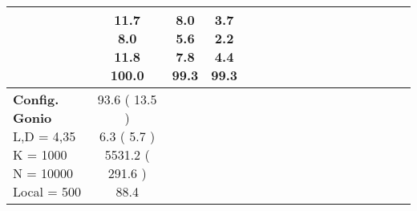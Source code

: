 \documentclass[9pt]{article}
\begin{document}
\begin{landscape}
\begin{longtable}{ l | c c c c | c c c c | c c c c | c c c c |}
             &
                            \makecell{              11.7
     \\
            {\footnotesize             8.0
    } \\  {\footnotesize             11.8
     } \\
            {\small \textcolor[rgb]{ 0.2 , 0.7 , 0.1} {100.0  }
} }
             &                         \makecell{              8.0
     \\
            {\footnotesize             5.6
    } \\  {\footnotesize             7.8
     } \\
            {\small \textcolor[rgb]{ 0.214 , 0.687 , 0.1} {99.3  }
} }
             &
                            \makecell{              \textbf{ 3.7 }
     \\
            {\footnotesize             \textbf{ 2.2 }
    } \\  {\footnotesize             4.4
     } \\
            {\small \textcolor[rgb]{ 0.214 , 0.687 , 0.1} {99.3  }
} }
            

 \\
                                                            
                    \hline
                    \makecell{ \textbf{ Config. Gonio} \\
                    { \small L,D = 4,35} \\
                    {\small K = 1000} \\
                    {\small N = 10000 } \\ {\small Local = 500 }} &
                    
                            \makecell{              93.6
     (             13.5
    ) \\
            {\footnotesize             6.3
     (              5.7
     )} \\
            {\footnotesize             5531.2
     (            291.6
    ) } \\
            {\small  \textcolor[rgb]{ 0.432 , 0.468 , 0.1} {88.4  }
} }



\end{longtable}
\end{landscape}
\end{document}
